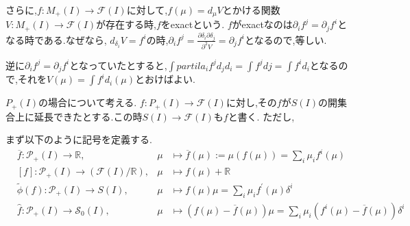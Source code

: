 \documentclass[dvipdfmx]{ujarticle}
\begin{document}
さらに,$f: M_+(I) \to \mathcal{F}(I)$に対して,$f(\mu) = d_{\mu}V$とかける関数$V: M_+(I) \to \mathcal{F}(I)$が存在する時,$f$をexactという.
$f$がexactなのは$\partial_i f^j = \partial_j f^i$となる時である.なぜなら,
$d_{\delta_i}V = f^i$の時,$\partial_i f^j = \frac{\partial \delta_i \partial \delta_j}{\partial^2 V} = \partial_j f^i$となるので,等しい.

逆に$\partial_i f^j = \partial_j f^i$となっていたとすると,$\int partila_i f^j d_j d_i = \int f^j dj = \int f^i d_i$となるので,それを$V(\mu) = \int f^i d_i (\mu)$とおけばよい.

$P_{+}(I)$の場合について考える.
$f: P_{+}(I) \to \mathcal{F}(I)$に対し,その$f$が$S(I)$の開集合上に延長できたとする.この時$S(I) \to \mathcal{F}(I)$も$f$と書く.
ただし,

まず以下のように記号を定義する.
$$
\begin{aligned}
  & \overline{f} : \mathcal{P}_{+}(I) \rightarrow \mathbb{R}, & \mu &\mapsto \overline{f}(\mu) :=\mu(f(\mu))=\sum_{i} \mu_{i} f^{i}(\mu) \\
  & [f] : \mathcal{P}_{+}(I) \rightarrow(\mathcal{F}(I) / \mathbb{R}), & \mu &\mapsto f(\mu)+\mathbb{R} \\
  & \tilde{\phi}(f) : \mathcal{P}_{+}(I) \rightarrow S(I), & \mu &\mapsto f(\mu) \mu=\sum_{i} \mu_{i} f^{\prime}(\mu) \delta^{i} \\
  & \hat{f} : \mathcal{P}_{+}(I) \rightarrow \mathcal{S}_{0}(I), & \mu &\mapsto(f(\mu)-\overline{f}(\mu)) \mu=\sum_{i} \mu_{i}\left(f^{i}(\mu)-\overline{f}(\mu)\right) \delta^{i}
\end{aligned}
$$
\end{document}
